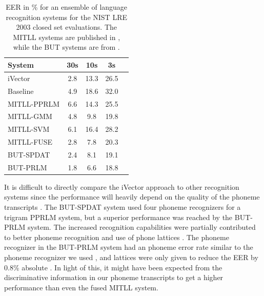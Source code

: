 \begin{table}[hbt!]
\begin{center}
\begin{tabular}{| l | c | c | c | c |}
\hline
System & 30s & 10s & 3s \\
\hline
iVector & 2.8 & 13.3 & 26.5 \\
Baseline & 4.9 & 18.6 & 32.0 \\
\hline
MITLL-PPRLM & 6.6 & 14.3 & 25.5 \\
MITLL-GMM & 4.8 & 9.8 & 19.8 \\
MITLL-SVM & 6.1 & 16.4 & 28.2 \\
MITLL-FUSE & 2.8 & 7.8 & 20.3 \\
\hline
BUT-SPDAT & 2.4 & 8.1 & 19.1 \\
BUT-PRLM &1.8 & 6.6 & 18.8 \\
\hline
\end{tabular}
\end{center}
\caption{EER in \% for an ensemble of language recognition systems for the NIST LRE 2003 closed set evaluations. The MITLL systems are published in \cite{singer2003acoustic}, while the BUT systems are from \cite{matejka2006use}.}
\label{tab:compdetresults}
\end{table}

It is difficult to directly compare the iVector approach to other recognition systems since the performance will heavily depend on the quality of the phoneme transcripts \cite[p. 64]{butphnrec}. The BUT-SPDAT system used four phoneme recognizers for a trigram PPRLM system, but a superior performance was reached by the BUT-PRLM system. The increased recognition capabilities were partially contributed to better phoneme recognition and use of phone lattices \cite{matejka2006use}. The phoneme recognizer in the BUT-PRLM system had an phoneme error rate similar to the phoneme recognizer we used \cite[p. 58]{butphnrec}, and lattices were only given to reduce the EER by $0.8$\% absolute \cite{matejka2006use}.  In light of this, it might have been expected from the discriminative information in our phoneme transcripts to get a higher performance than even the fused MITLL system.







